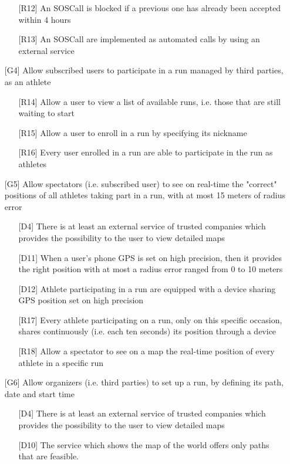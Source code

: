 \begin{itemize}
\begin{itemize}
	\item[{[R12]}] An SOSCall is blocked if a previous one has already been accepted within 4 hours 
	\item[{[R13]}] An SOSCall are implemented as automated calls by using an external service
	\end{itemize}
\item[{[G4]}] Allow subscribed users to participate in a run managed by third parties, as an athlete 
	\begin{itemize}
	\item[{[R14]}] Allow a user to view a list of available runs, i.e. those that are still waiting to start 
	\item[{[R15]}] Allow a user to enroll in a run by specifying its nickname
	\item[{[R16]}] Every user enrolled in a run are able to participate in the run as athletes
	\end{itemize}
\item[{[G5]}] Allow spectators (i.e. subscribed user) to see on real-time the "correct" positions of all athletes taking part in a run, with at most 15 meters of radius error
	\begin{itemize}
	\item[{[D4]}] There is at least an external service of trusted companies which provides the possibility to the user to view detailed maps
	\item[{[D11]}] When a user's phone GPS is set on high precision, then it provides the right position with at most a radius error ranged from 0 to 10 meters
	\item[{[D12]}] Athlete participating in a run are equipped with a device sharing GPS position set on high precision
	\item[{[R17]}] Every athlete participating on a run, only on this specific occasion, shares continuously (i.e. each ten seconds) its position through a device
	\item[{[R18]}] Allow a spectator to see on a map the real-time position of every athlete in a specific run
	\end{itemize}
\item[{[G6]}] Allow organizers (i.e. third parties) to set up a run, by defining its path, date and start time
	\begin{itemize}
	\item[{[D4]}] There is at least an external service of trusted companies which provides the possibility to the user to view detailed maps
	\item[{[D10]}] The service which shows the map of the world offers only paths that are feasible.

\end{itemize}
\end{itemize}
